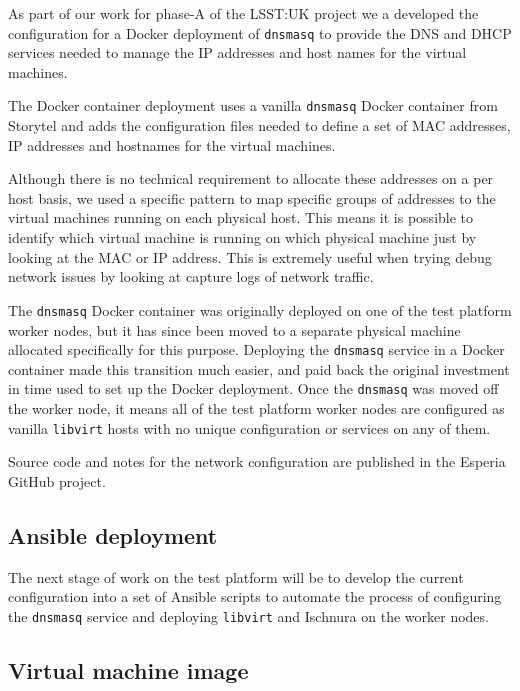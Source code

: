 \documentclass{article}
\newcommand{\ansible} {Ansible\xspace}
\newcommand{\docker} {Docker\xspace}
\newcommand{\dnsmasq} {\texttt{dnsmasq}\xspace}
\newcommand{\ischnura} {Ischnura\xspace}
\newcommand{\esperia} {Esperia\xspace}
\newcommand{\libvirt} {\texttt{libvirt}\xspace}
\newcommand{\github} {GitHub\xspace}
\newcommand{\phasea} {phase-A\xspace}
\newcommand{\lsstuk} {LSST:UK\xspace}
\newcommand{\testplatform} {test platform\xspace}
\begin{document}
As part of our work for \phasea of the \lsstuk project we a developed the configuration for a \docker deployment of \dnsmasq to provide the DNS and DHCP services needed to manage the IP addresses and host names for the virtual machines.

The \docker container deployment uses a vanilla \dnsmasq \docker container from Storytel and adds the configuration files needed to define a set of MAC addresses, IP addresses and hostnames for the virtual machines.

Although there is no technical requirement to allocate these addresses on a per host basis, we used a specific pattern to map specific groups of addresses to the virtual machines running on each physical host.
This means it is possible to identify which virtual machine is running on which physical machine just by looking at the MAC or IP address. This is extremely useful when trying debug network issues by looking at capture logs of network traffic.

The \dnsmasq \docker container was originally deployed on one of the \testplatform worker nodes, but it has since been moved to a separate physical machine allocated specifically for this purpose.
Deploying the \dnsmasq service in a \docker container made this transition much easier, and paid back the original investment in time used to set up the \docker deployment.
Once the \dnsmasq was moved off the worker node, it means all of the \testplatform worker nodes are configured as vanilla \libvirt hosts with no unique configuration or services on any of them.
 
Source code and notes for the network configuration are published in the \esperia \github project.

\subsection{Ansible deployment}
\label{deployment-testbed.ansible}

The next stage of work on the \testplatform will be to develop the current configuration into a set of \ansible scripts to automate the process of configuring the \dnsmasq service and deploying \libvirt and \ischnura on the worker nodes.

\subsection{Virtual machine image}
\label{deployment-vm-image}
\end{document}
